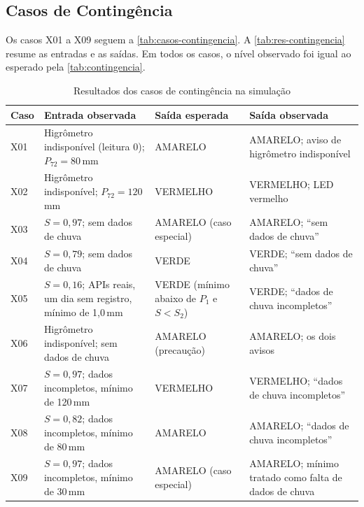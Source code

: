 \subsection{Casos de Contingência}
\label{subsec:res-contingencia}

Os casos X01 a X09 seguem a \autoref{tab:casos-contingencia}. A
\autoref{tab:res-contingencia} resume as entradas e as saídas. Em todos
os casos, o nível observado foi igual ao esperado pela
\autoref{tab:contingencia}.

\begin{table}[H]
\centering
\caption{Resultados dos casos de contingência na simulação}
\label{tab:res-contingencia}
\small
\begin{tabular}{p{0.9cm}p{5.2cm}p{3.6cm}p{4.4cm}}
\hline
\textbf{Caso} & \textbf{Entrada observada} & \textbf{Saída esperada} & \textbf{Saída observada} \\
\hline
X01 & Higrômetro indisponível (leitura 0); $P_{72} = 80$\,mm & AMARELO & AMARELO; aviso de higrômetro indisponível \\
X02 & Higrômetro indisponível; $P_{72} = 120$\,mm & VERMELHO & VERMELHO; LED vermelho \\
X03 & $S = 0{,}97$; sem dados de chuva & AMARELO (caso especial) & AMARELO; ``sem dados de chuva'' \\
X04 & $S = 0{,}79$; sem dados de chuva & VERDE & VERDE; ``sem dados de chuva'' \\
X05 & $S = 0{,}16$; APIs reais, um dia sem registro, mínimo de 1,0\,mm & VERDE (mínimo abaixo de $P_1$ e $S < S_2$) & VERDE; ``dados de chuva incompletos'' \\
X06 & Higrômetro indisponível; sem dados de chuva & AMARELO (precaução) & AMARELO; os dois avisos \\
X07 & $S = 0{,}97$; dados incompletos, mínimo de 120\,mm & VERMELHO & VERMELHO; ``dados de chuva incompletos'' \\
X08 & $S = 0{,}82$; dados incompletos, mínimo de 80\,mm & AMARELO & AMARELO; ``dados de chuva incompletos'' \\
X09 & $S = 0{,}97$; dados incompletos, mínimo de 30\,mm & AMARELO (caso especial) & AMARELO; mínimo tratado como falta de dados de chuva \\
\hline
\end{tabular}
\end{table}

